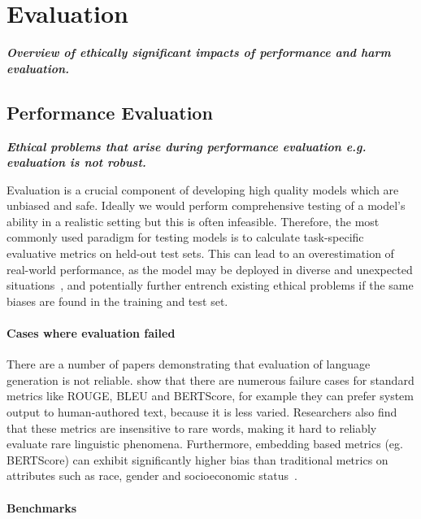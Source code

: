 \section{Evaluation}\label{sec:eval}

\noindent\textbf{\textit{Overview of ethically significant impacts of performance and harm evaluation.}}

\subsection{Performance Evaluation}\noindent\textbf{\textit{Ethical problems that arise during performance evaluation e.g. evaluation is not robust.}}
\newline 

\noindent Evaluation is a crucial component of developing high quality models which are unbiased and safe. Ideally we would perform comprehensive testing of a model's ability in a realistic setting but this is often infeasible. Therefore, the most commonly used paradigm for testing models is to calculate task-specific evaluative metrics on held-out test sets. This can lead to an overestimation of real-world performance, as the model may be deployed in diverse and unexpected situations~\citep{ribeiro_beyond_2020}, and potentially further entrench existing ethical problems if the same biases are found in the training and test set. 

\paragraph{Cases where evaluation failed}

There are a number of papers demonstrating that evaluation of language generation is not reliable. \citet{caglayan_curious_2020} show that there are numerous failure cases for standard metrics like ROUGE, BLEU and BERTScore, for example they can prefer system output to human-authored text, because it is less varied. Researchers also find that these metrics are insensitive to rare words, making it hard to reliably evaluate rare linguistic phenomena. Furthermore, embedding based metrics (eg. BERTScore) can exhibit significantly higher bias than traditional metrics on attributes such as race, gender and socioeconomic status~\cite{sun_bertscore_2022}. 

\paragraph{Benchmarks}

